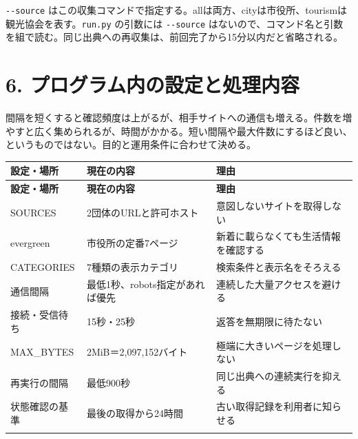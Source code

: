 \documentclass[a4paper,10pt]{ltjsarticle}
\begin{document}
\nolinkurl{--source} はこの収集コマンドで指定する。allは両方、cityは市役所、tourismは観光協会を表す。\nolinkurl{run.py} の引数には \nolinkurl{--source} はないので、コマンド名と引数を組で読む。同じ出典への再収集は、前回完了から15分以内だと省略される。


\clearpage

\section*{6. プログラム内の設定と処理内容}

間隔を短くすると確認頻度は上がるが、相手サイトへの通信も増える。件数を増やすと広く集められるが、時間がかかる。短い間隔や最大件数にするほど良い、というものではない。目的と運用条件に合わせて決める。


{\small\begin{longtable}{@{}>{\raggedright\arraybackslash}p{}>{\raggedright\arraybackslash}p{}>{\raggedright\arraybackslash}p{}@{}}

\rowcolor{Pale}\textbf{設定・場所} & \textbf{現在の内容} & \textbf{理由} \\ \midrule

\endfirsthead

\rowcolor{Pale}\textbf{設定・場所} & \textbf{現在の内容} & \textbf{理由} \\ \midrule\endhead

SOURCES & 2団体のURLと許可ホスト & 意図しないサイトを取得しない \\ \addlinespace[3pt]

evergreen & 市役所の定番7ページ & 新着に載らなくても生活情報を確認する \\ \addlinespace[3pt]

CATEGORIES & 7種類の表示カテゴリ & 検索条件と表示名をそろえる \\ \addlinespace[3pt]

通信間隔 & 最低1秒、robots指定があれば優先 & 連続した大量アクセスを避ける \\ \addlinespace[3pt]

接続・受信待ち & 15秒・25秒 & 返答を無期限に待たない \\ \addlinespace[3pt]

MAX\_BYTES & 2MiB＝2,097,152バイト & 極端に大きいページを処理しない \\ \addlinespace[3pt]

再実行の間隔 & 最低900秒 & 同じ出典への連続実行を抑える \\ \addlinespace[3pt]

状態確認の基準 & 最後の取得から24時間 & 古い取得記録を利用者に知らせる \\ \addlinespace[3pt]

\bottomrule\end{longtable}}
\end{document}

